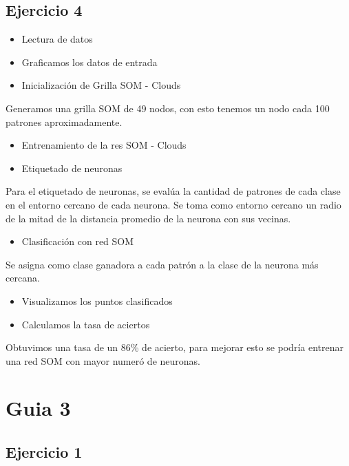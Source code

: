 \documentclass[]{book}
\providecommand{\tightlist}{%
  \setlength{\itemsep}{0pt}\setlength{\parskip}{0pt}}
\begin{document}
\hypertarget{ejercicio-4-1}{%
\section{Ejercicio 4}\label{ejercicio-4-1}}

\begin{itemize}
\item
  Lectura de datos
\item
  Graficamos los datos de entrada
\item
  Inicialización de Grilla SOM - Clouds
\end{itemize}

Generamos una grilla SOM de 49 nodos, con esto tenemos un nodo cada 100 patrones aproximadamente.

\begin{itemize}
\item
  Entrenamiento de la res SOM - Clouds
\item
  Etiquetado de neuronas
\end{itemize}

Para el etiquetado de neuronas, se evalúa la cantidad de patrones de cada clase en el entorno cercano de cada neurona. Se toma como entorno cercano un radio de la mitad de la distancia promedio de la neurona con sus vecinas.

\begin{itemize}
\tightlist
\item
  Clasificación con red SOM
\end{itemize}

Se asigna como clase ganadora a cada patrón a la clase de la neurona más cercana.

\begin{itemize}
\item
  Visualizamos los puntos clasificados
\item
  Calculamos la tasa de aciertos
\end{itemize}

Obtuvimos una tasa de un 86\% de acierto, para mejorar esto se podría entrenar una red SOM con mayor numeró de neuronas.

\hypertarget{guia-3}{%
\chapter{Guia 3}\label{guia-3}}

\hypertarget{ejercicio-1-2}{%
\section{Ejercicio 1}\label{ejercicio-1-2}}
\end{document}
